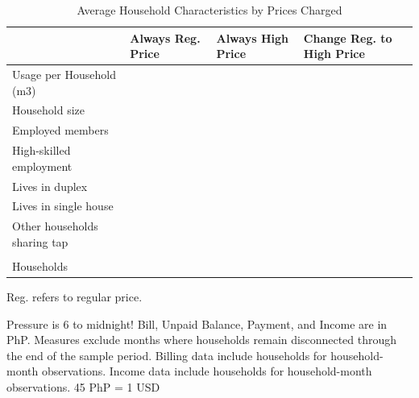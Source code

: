 \documentclass[12pt,table]{article}
\begin{document}
\begin{table}[h!] %
\centering
\caption{Average Household Characteristics by Prices Charged}\label{table:pricechangestatistics}
\vspace{-2mm}
\begin{threeparttable}
\begin{tabular}{@{}l*{1}{KKK}@{}}
\toprule
  & Always Reg. Price & Always High Price  & Change Reg. to High Price \\
\midrule
Usage per Household (m3)&  \\
Household size &  \\
Employed members &  \\
High-skilled employment &  \\
Lives in duplex&  \\
Lives in single house&  \\
Other households sharing tap&  \\
\\[-.5em]
Households &  \\
\bottomrule
\end{tabular}
\begin{tablenotes}
\footnotesize
\item  Reg. refers to regular price.  

Pressure is 6 to midnight! Bill, Unpaid Balance, Payment, and Income are in PhP.  Measures exclude months where households remain disconnected through the end of the sample period.  Billing data include households for household-month observations.  Income data include households for household-month observations.  45 PhP = 1 USD \,\,
\end{tablenotes}
\end{threeparttable}
\end{table}
\end{document}
